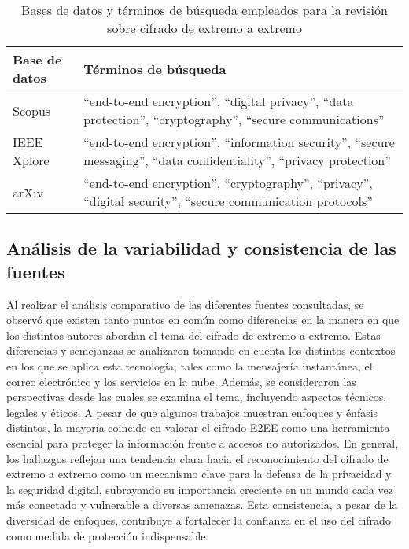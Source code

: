 \documentclass[spanish,12pt,a4paper]{article}
\begin{document}
	\begin{table}[ht]
		\centering
		\caption{Bases de datos y términos de búsqueda empleados para la revisión sobre cifrado de extremo a extremo}
		\label{tab:busqueda}
		\vspace{0.5cm}
		\begin{tabularx}{\textwidth}{l X}
			\hline
			\textbf{Base de datos} & \textbf{Términos de búsqueda} \\
			\hline
			Scopus & “end-to-end encryption”, “digital privacy”, “data protection”, “cryptography”, “secure communications” \\
			\hline
			IEEE Xplore & “end-to-end encryption”, “information security”, “secure messaging”, “data confidentiality”, “privacy protection” \\
			\hline
			arXiv & “end-to-end encryption”, “cryptography”, “privacy”, “digital security”, “secure communication protocols” \\
			\hline
		\end{tabularx}
	\end{table}
	
	
		
	\begin{multicols}{2}
		
		\subsection*{\normalsize Análisis de la variabilidad y consistencia de las fuentes }
		
		Al realizar el análisis comparativo de las diferentes fuentes consultadas, se observó que existen tanto puntos en común como diferencias en la manera en que los distintos autores abordan el tema del cifrado de extremo a extremo. Estas diferencias y semejanzas se analizaron tomando en cuenta los distintos contextos en los que se aplica esta tecnología, tales como la mensajería instantánea, el correo electrónico y los servicios en la nube. Además, se consideraron las perspectivas desde las cuales se examina el tema, incluyendo aspectos técnicos, legales y éticos. A pesar de que algunos trabajos muestran enfoques y énfasis distintos, la mayoría coincide en valorar el cifrado E2EE como una herramienta esencial para proteger la información frente a accesos no autorizados. En general, los hallazgos reflejan una tendencia clara hacia el reconocimiento del cifrado de extremo a extremo como un mecanismo clave para la defensa de la privacidad y la seguridad digital, subrayando su importancia creciente en un mundo cada vez más conectado y vulnerable a diversas amenazas. Esta consistencia, a pesar de la diversidad de enfoques, contribuye a fortalecer la confianza en el uso del cifrado como medida de protección indispensable.
	\end{multicols}
\end{document}
